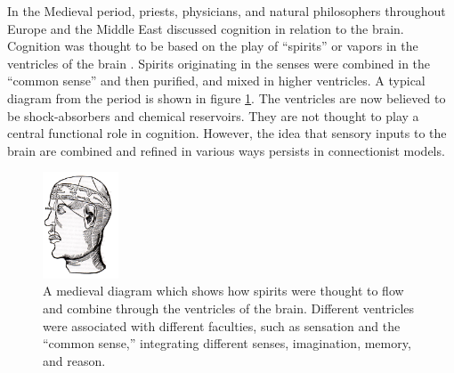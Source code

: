 In the Medieval period, priests, physicians, and natural philosophers throughout Europe and the Middle East discussed cognition in relation to the brain. Cognition was thought to be based on the play of ``spirits'' or vapors in the ventricles of the brain \cite{finger2001origins}. Spirits originating in the senses were combined in the ``common sense'' and then purified, and mixed in higher ventricles. A typical diagram from the period is shown in figure \ref{medieval}. The ventricles are now believed to be shock-absorbers and chemical reservoirs. They are not thought to play a central functional role in cognition. However, the idea that sensory inputs to the brain are combined and refined in various ways persists in connectionist models.


\begin{figure}[h]
\centering
\includegraphics[width=0.2\textwidth]{./images/humoral.png}
\caption[From Gr\"{u}sser, 1990 \cite{grusser1990seat}]{A medieval diagram which shows how spirits were thought to flow and combine through the ventricles of the brain. Different ventricles were associated with different faculties, such as sensation and the ``common sense,'' integrating different senses, imagination, memory, and reason.}
\label{medieval}
\end{figure}

